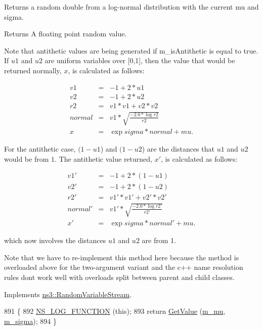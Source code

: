 Returns a random double from a log-\/normal distribution with the current mu and sigma. 

\begin{DoxyReturn}{Returns}
A floating point random value.
\end{DoxyReturn}
Note that antithetic values are being generated if m\+\_\+is\+Antithetic is equal to true. If $u1$ and $u2$ are uniform variables over \mbox{[}0,1\mbox{]}, then the value that would be returned normally, $x$, is calculated as follows\+:

\begin{eqnarray*} v1 & = & -1 + 2 * u1 \\ v2 & = & -1 + 2 * u2 \\ r2 & = & v1 * v1 + v2 * v2 \\ normal & = & v1 * \sqrt{\frac{-2.0 * \log{r2}}{r2}} \\ x & = & \exp{sigma * normal + mu} . \end{eqnarray*}

For the antithetic case, $(1 - u1$) and $(1 - u2$) are the distances that $u1$ and $u2$ would be from $1$. The antithetic value returned, $x'$, is calculated as follows\+:

\begin{eqnarray*} v1' & = & -1 + 2 * (1 - u1) \\ v2' & = & -1 + 2 * (1 - u2) \\ r2' & = & v1' * v1' + v2' * v2' \\ normal' & = & v1' * \sqrt{\frac{-2.0 * \log{r2'}}{r2'}} \\ x' & = & \exp{sigma * normal' + mu} . \end{eqnarray*}

which now involves the distances $u1$ and $u2$ are from 1.

Note that we have to re-\/implement this method here because the method is overloaded above for the two-\/argument variant and the c++ name resolution rules don\textquotesingle{}t work well with overloads split between parent and child classes. 

Implements \hyperlink{classns3_1_1RandomVariableStream_a4fa5944dc4cb11544e661ed23072b36c}{ns3\+::\+Random\+Variable\+Stream}.


\begin{DoxyCode}
891 \{
892   \hyperlink{log-macros-disabled_8h_a90b90d5bad1f39cb1b64923ea94c0761}{NS\_LOG\_FUNCTION} (\textcolor{keyword}{this});
893   \textcolor{keywordflow}{return} \hyperlink{classns3_1_1LogNormalRandomVariable_a032ddb20a74ff98a35a76a2e43d12a0b}{GetValue} (\hyperlink{classns3_1_1LogNormalRandomVariable_a562108c77ea1dbc4786fe96d037b0fc9}{m\_mu}, \hyperlink{classns3_1_1LogNormalRandomVariable_a5836fe394673dd9f142e3a15904419a9}{m\_sigma});
894 \}
\end{DoxyCode}



